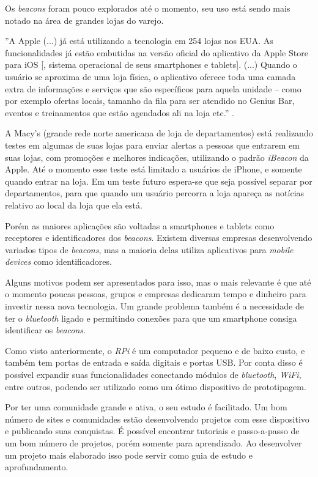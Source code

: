 \documentclass[
	12pt,				%
	openright,			%
	oneside,			%
	a4paper,			%
	chapter=TITLE,		%
	english,			%
	brazil				%
	]{abntex2}
\begin{document}
{Os \textit{beacons} foram pouco explorados até o momento, seu uso está sendo mais notado na área de grandes lojas do varejo.

\begin{citacao}
''A Apple (...) já está utilizando a tecnologia em 254 lojas nos EUA. As funcionalidades já estão embutidas na versão oficial do aplicativo da Apple Store para iOS [, sistema operacional de seus smartphones e tablets]. (...) Quando o usuário se aproxima de uma loja física, o aplicativo oferece toda uma camada extra de informações e serviços que são específicos para aquela unidade – como por exemplo ofertas locais, tamanho da fila para ser atendido no Genius Bar, eventos e treinamentos que estão agendados ali na loja etc.'' \cite{teixeira-beacon}.
\end{citacao}

A Macy's (grande rede norte americana de loja de departamentos) está realizando testes em algumas de suas lojas para enviar alertas a pessoas que entrarem em suas lojas, com promoções e melhores indicações, utilizando o padrão \textit{iBeacon} da Apple. Até o momento esse teste está limitado a usuários de iPhone, e somente quando entrar na loja. Em um teste futuro espera-se que seja possível separar por departamentos, para que quando um usuário percorra a loja apareça as notícias relativo ao local da loja que ela está. \cite{kastrenakes-macys-beacon}

Porém as maiores aplicações são voltadas a smartphones e tablets como receptores e identificadores dos \textit{beacons}. Existem diversas empresas desenvolvendo variados tipos de \textit{beacons}, mas a maioria delas utiliza aplicativos para \textit{mobile devices} como identificadores. 

Alguns motivos podem ser apresentados para isso, mas o mais relevante é que até o momento poucas pessoas, grupos e empresas dedicaram tempo e dinheiro para investir nessa nova tecnologia. Um grande problema também é a necessidade de ter o \textit{bluetooth} ligado e permitindo conexões para que um smartphone consiga identificar os \textit{beacons}.

Como visto anteriormente, o \textit{RPi} é um computador pequeno e de baixo custo, e também tem portas de entrada e saída digitais e portas USB. Por conta disso é possível expandir suas funcionalidades conectando módulos de \textit{bluetooth}, \textit{WiFi}, entre outros, podendo ser utilizado como um ótimo dispositivo de prototipagem.

Por ter uma comunidade grande e ativa, o seu estudo é facilitado. Um bom número de sites e comunidades estão desenvolvendo projetos com esse dispositivo e publicando suas conquistas. É possível encontrar tutoriais e passo-a-passo de um bom número de projetos, porém somente para aprendizado. Ao desenvolver um projeto mais elaborado isso pode servir como guia de estudo e aprofundamento.

}
\end{document}
